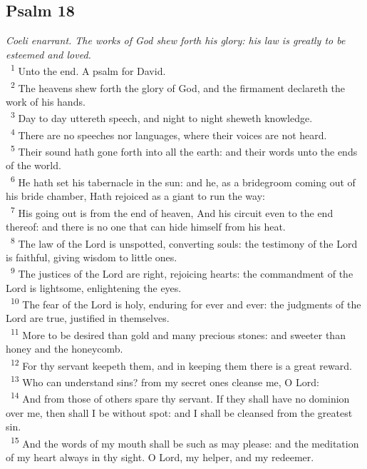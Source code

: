 \documentclass[a5paper,12pt]{article}
\begin{document}
\begin{multicols*}{2}
\section{Psalm 18}
\label{sec:org1061e10}
\emph{Coeli enarrant. The works of God shew forth his glory: his law is greatly to be esteemed and loved.}\\

~\textsuperscript{1} Unto the end. A psalm for David.\\
~\textsuperscript{2} The heavens shew forth the glory of God, and the firmament declareth the work of his hands.\\
~\textsuperscript{3} Day to day uttereth speech, and night to night sheweth knowledge.\\
~\textsuperscript{4} There are no speeches nor languages, where their voices are not heard.\\
~\textsuperscript{5} Their sound hath gone forth into all the earth: and their words unto the ends of the world.\\
~\textsuperscript{6} He hath set his tabernacle in the sun: and he, as a bridegroom coming out of his bride chamber, Hath rejoiced as a giant to run the way:\\
~\textsuperscript{7} His going out is from the end of heaven, And his circuit even to the end thereof: and there is no one that can hide himself from his heat.\\
~\textsuperscript{8} The law of the Lord is unspotted, converting souls: the testimony of the Lord is faithful, giving wisdom to little ones.\\
~\textsuperscript{9} The justices of the Lord are right, rejoicing hearts: the commandment of the Lord is lightsome, enlightening the eyes.\\
~\textsuperscript{10} The fear of the Lord is holy, enduring for ever and ever: the judgments of the Lord are true, justified in themselves.\\
~\textsuperscript{11} More to be desired than gold and many precious stones: and sweeter than honey and the honeycomb.\\
~\textsuperscript{12} For thy servant keepeth them, and in keeping them there is a great reward.\\
~\textsuperscript{13} Who can understand sins? from my secret ones cleanse me, O Lord:\\
~\textsuperscript{14} And from those of others spare thy servant. If they shall have no dominion over me, then shall I be without spot: and I shall be cleansed from the greatest sin.\\
~\textsuperscript{15} And the words of my mouth shall be such as may please: and the meditation of my heart always in thy sight. O Lord, my helper, and my redeemer.\\


\end{multicols*}
\end{document}
